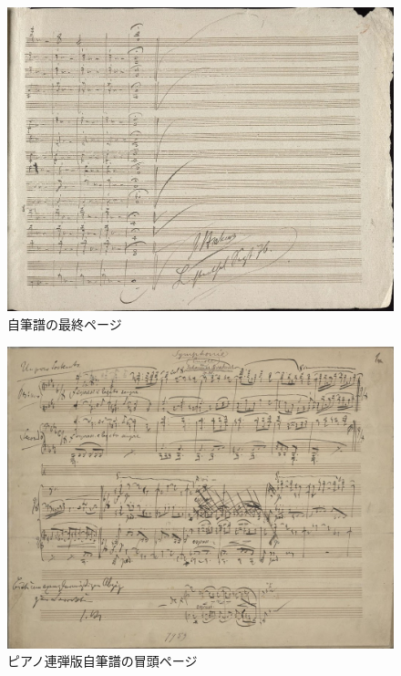 \begin{figure}[htbp]
	\centering
    \includegraphics[clip,width=12.0cm]{./figure/mov4-59.jpg}
	\caption{自筆譜の最終ページ}
    \label{fig: mov4-59}
\end{figure}

\begin{figure}[htbp]
	\centering
    \includegraphics[clip,width=12.0cm]{./figure/mov1(4H)-01.jpg}
	\caption{ピアノ連弾版自筆譜の冒頭ページ}
    \label{fig: mov1(4H)-01}
\end{figure}
